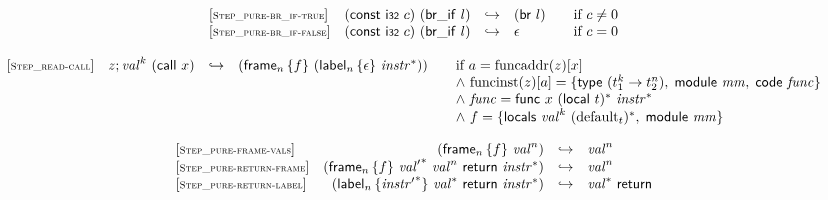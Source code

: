 \documentclass{article}
\begin{document}
\vspace{1ex}

$$
\begin{array}{@{}l@{}rcl@{}l@{}}
	{[\textsc{\scriptsize Step\_pure{-}br\_if{-}true}]} \quad & (\mathsf{const}~\mathsf{i{\scriptstyle 32}}~c)~(\mathsf{br\_if}~l) &\hookrightarrow& (\mathsf{br}~l)
	&\qquad \mbox{if}~c \neq 0 \\
	{[\textsc{\scriptsize Step\_pure{-}br\_if{-}false}]} \quad & (\mathsf{const}~\mathsf{i{\scriptstyle 32}}~c)~(\mathsf{br\_if}~l) &\hookrightarrow& \epsilon
	&\qquad \mbox{if}~c = 0 \\
\end{array}
$$

\vspace{1ex}

$$
\begin{array}{@{}l@{}rcl@{}l@{}}
	{[\textsc{\scriptsize Step\_read{-}call}]} \quad & z ; {{\mathit{val}}^{k}}~(\mathsf{call}~x) &\hookrightarrow& ({\mathsf{frame}}_{n}\,\{ f \}~({\mathsf{label}}_{n}\,\{ \epsilon \}~{{\mathit{instr}}^\ast}))
	&\qquad \mbox{if}~a = {\mathrm{funcaddr}}(z){}[x] \\
	&&&&\qquad {\land}~{\mathrm{funcinst}}(z){}[a] = \{ \begin{array}[t]{@{}l@{}}
		\mathsf{type}~({t_1^{k}} \rightarrow {t_2^{n}}),\; \mathsf{module}~{\mathit{mm}},\; \mathsf{code}~{\mathit{func}} \}\end{array} \\
	&&&&\qquad {\land}~{\mathit{func}} = \mathsf{func}~x~{(\mathsf{local}~t)^\ast}~{{\mathit{instr}}^\ast} \\
	&&&&\qquad {\land}~f = \{ \begin{array}[t]{@{}l@{}}
		\mathsf{locals}~{{\mathit{val}}^{k}}~{({{\mathrm{default}}}_{t})^\ast},\; \mathsf{module}~{\mathit{mm}} \}\end{array} \\
\end{array}
$$

$$
\begin{array}{@{}l@{}rcl@{}l@{}}
	{[\textsc{\scriptsize Step\_pure{-}frame{-}vals}]} \quad & ({\mathsf{frame}}_{n}\,\{ f \}~{{\mathit{val}}^{n}}) &\hookrightarrow& {{\mathit{val}}^{n}} \\
	{[\textsc{\scriptsize Step\_pure{-}return{-}frame}]} \quad & ({\mathsf{frame}}_{n}\,\{ f \}~{{\mathit{val}'}^\ast}~{{\mathit{val}}^{n}}~\mathsf{return}~{{\mathit{instr}}^\ast}) &\hookrightarrow& {{\mathit{val}}^{n}} \\
	{[\textsc{\scriptsize Step\_pure{-}return{-}label}]} \quad & ({\mathsf{label}}_{n}\,\{ {{\mathit{instr}'}^\ast} \}~{{\mathit{val}}^\ast}~\mathsf{return}~{{\mathit{instr}}^\ast}) &\hookrightarrow& {{\mathit{val}}^\ast}~\mathsf{return} \\
\end{array}
$$
\end{document}
